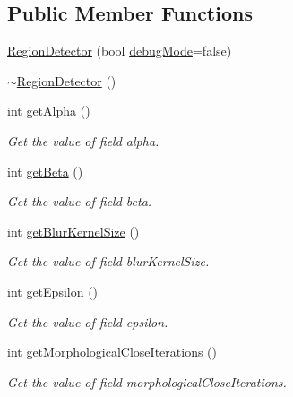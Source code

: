 \subsection*{Public Member Functions}
\begin{DoxyCompactItemize}
\item 
\hyperlink{classmultiscale_1_1analysis_1_1RegionDetector_aa6e891d8940358fe71e9a7e23f84452f}{Region\-Detector} (bool \hyperlink{classmultiscale_1_1analysis_1_1Detector_a4b42f796957efd6ee0b8cf7645494a65}{debug\-Mode}=false)
\item 
\hyperlink{classmultiscale_1_1analysis_1_1RegionDetector_a8e41bcae0698a746fee06e8fb9a63bd1}{$\sim$\-Region\-Detector} ()
\item 
int \hyperlink{classmultiscale_1_1analysis_1_1RegionDetector_a0cc3c3bfcd5e29b19a30acd0566a9d71}{get\-Alpha} ()
\begin{DoxyCompactList}\small\item\em Get the value of field alpha. \end{DoxyCompactList}\item 
int \hyperlink{classmultiscale_1_1analysis_1_1RegionDetector_a1b60390d9e55980ecf1da3616782a7e3}{get\-Beta} ()
\begin{DoxyCompactList}\small\item\em Get the value of field beta. \end{DoxyCompactList}\item 
int \hyperlink{classmultiscale_1_1analysis_1_1RegionDetector_af0b30b57a664d7a5b1bb0ec6be5e8068}{get\-Blur\-Kernel\-Size} ()
\begin{DoxyCompactList}\small\item\em Get the value of field blur\-Kernel\-Size. \end{DoxyCompactList}\item 
int \hyperlink{classmultiscale_1_1analysis_1_1RegionDetector_a730df92f22ef336a5e24ffdb9afa50c9}{get\-Epsilon} ()
\begin{DoxyCompactList}\small\item\em Get the value of field epsilon. \end{DoxyCompactList}\item 
int \hyperlink{classmultiscale_1_1analysis_1_1RegionDetector_a6099482d13eaf15e3c199155ba0a8816}{get\-Morphological\-Close\-Iterations} ()
\begin{DoxyCompactList}\small\item\em Get the value of field morphological\-Close\-Iterations. \end{DoxyCompactList}\item 

\end{DoxyCompactItemize}
